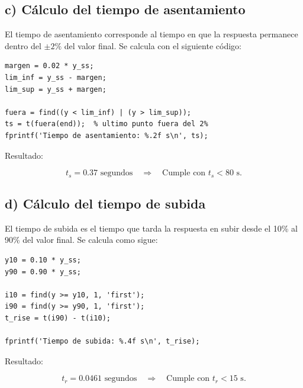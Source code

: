 \documentclass[11pt,letterpaper]{article}
\begin{document}
\vspace{1em}

\subsection*{c) Cálculo del tiempo de asentamiento}

El tiempo de asentamiento corresponde al tiempo en que la respuesta permanece dentro del $\pm2\%$ del valor final. Se calcula con el siguiente código:

\begin{lstlisting}[caption={Cálculo del tiempo de asentamiento}]
margen = 0.02 * y_ss;
lim_inf = y_ss - margen;
lim_sup = y_ss + margen;

fuera = find((y < lim_inf) | (y > lim_sup));
ts = t(fuera(end));  % ultimo punto fuera del 2%
fprintf('Tiempo de asentamiento: %.2f s\n', ts);
\end{lstlisting}

Resultado:

\begin{equation}
t_s = 0.37 \text{ segundos} \quad \Rightarrow \quad \text{Cumple con } t_s < 80 \text{ s.}
\end{equation}

\vspace{1em}

\subsection*{d) Cálculo del tiempo de subida}

El tiempo de subida es el tiempo que tarda la respuesta en subir desde el 10\% al 90\% del valor final. Se calcula como sigue:

\begin{lstlisting}[caption={Cálculo del tiempo de subida}]
y10 = 0.10 * y_ss;
y90 = 0.90 * y_ss;

i10 = find(y >= y10, 1, 'first');
i90 = find(y >= y90, 1, 'first');
t_rise = t(i90) - t(i10);

fprintf('Tiempo de subida: %.4f s\n', t_rise);
\end{lstlisting}

Resultado:

\begin{equation}
t_r = 0.0461 \text{ segundos} \quad \Rightarrow \quad \text{Cumple con } t_r < 15 \text{ s.}
\end{equation}

\vspace{1em}
\end{document}
